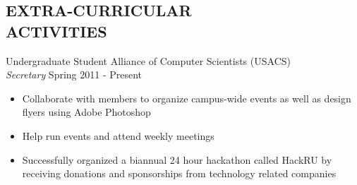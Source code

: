 \documentclass[margin]{res}
\begin{document}
\begin{resume}
\section{EXTRA-CURRICULAR \\ ACTIVITIES}             
            Undergraduate Student Alliance of Computer Scientists (USACS)\\
            {\sl Secretary} \hfill Spring 2011 - Present
            \begin{itemize} \itemsep -2pt
             \item Collaborate with members to organize campus-wide events as well as design flyers using Adobe Photoshop
             \item Help run events and attend weekly meetings
             \item Successfully organized a biannual 24 hour hackathon called HackRU by receiving donations and sponsorships from technology related companies
            \end{itemize}

 

\end{resume}
\end{document}
